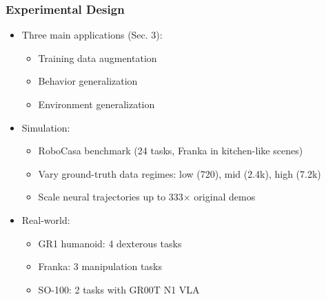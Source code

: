\documentclass{beamer}
\begin{document}
\begin{frame}
  \frametitle{Experimental Design}
  \small
  \begin{itemize}
    \item Three main applications (Sec. 3):
      \begin{itemize}
        \item Training data augmentation
        \item Behavior generalization
        \item Environment generalization
      \end{itemize}
    \item Simulation:
      \begin{itemize}
        \item RoboCasa benchmark (24 tasks, Franka in kitchen-like scenes)
        \item Vary ground-truth data regimes: low (720), mid (2.4k), high (7.2k)
        \item Scale neural trajectories up to 333$\times$ original demos
      \end{itemize}
    \item Real-world:
      \begin{itemize}
        \item GR1 humanoid: 4 dexterous tasks
        \item Franka: 3 manipulation tasks
        \item SO-100: 2 tasks with GR00T N1 VLA
      \end{itemize}
  \end{itemize}
\end{frame}
\end{document}
